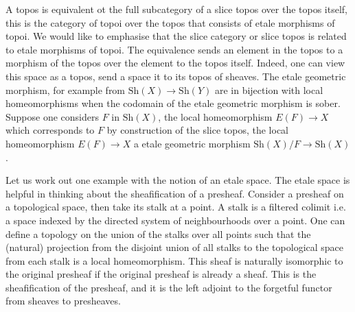 \documentclass[12pt]{article}
\begin{document}
A topos is equivalent ot the full subcategory of a slice topos over the topos itself, this is the category of topoi over the topos that consists of etale morphisms of topoi. We would like to emphasise that the slice category or slice topos is related to etale morphisms of topoi. The equivalence sends an element in the topos to a morphism of the topos over the element to the topos itself. Indeed, one can view this space as a topos, send a space it to its topos of sheaves. The etale geometric morphism, for example from $\mathrm{Sh}(X) \rightarrow \mathrm{Sh}(Y)$ are in bijection with local homeomorphisms when the codomain of the etale geometric morphism is sober. Suppose one considers $F$ in $\mathrm{Sh}(X)$, the local homeomorphism $E(F) \rightarrow X$ which corresponds to $F$ by construction of the slice topos, the local homeomorphism $E(F) \rightarrow X$ a etale geometric morphism $\mathrm{Sh}(X)/F \rightarrow \mathrm{Sh}(X)$.

Let us work out one example with the notion of an etale space. The etale space is helpful in thinking about the sheafification of a presheaf. Consider a presheaf on a topological space, then take its stalk at a point. A stalk is a filtered colimit i.e. a space indexed by the directed system of neighbourhoods over a point. One can define a topology on the union of the stalks over all points such that the (natural) projection from the disjoint union of all stalks to the topological space from each stalk is a local homeomorphism. This sheaf is naturally isomorphic to the original presheaf if the original presheaf is already a sheaf. This is the sheafification of the presheaf, and it is the left adjoint to the forgetful functor from sheaves to presheaves.
\end{document}
